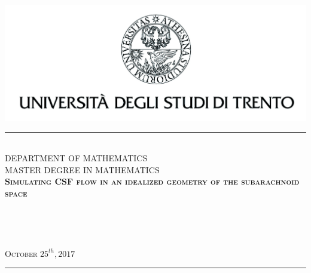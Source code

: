 \documentclass[a4paper,11pt,openright,twoside]{book}
\begin{document}

\begin{titlepage}
\begin{center}
\vspace*{-2.7cm}
\includegraphics{images/aquila_nome}
\\
\rule{\textwidth}{1pt}
\\[0.5cm]
{\Large DEPARTMENT OF MATHEMATICS}
\\[0.35cm]
{\Large MASTER DEGREE IN MATHEMATICS}
\\[3.5cm]
\textsc{\huge \textbf{Simulating CSF flow in an idealized geometry of the subarachnoid space}}
\\[4cm]
\begin{minipage}{0.5\textwidth}
\\
\end{minipage}
\begin{minipage}{0.45\textwidth}
\vspace{-3.2cm}
 \\
\end{minipage}

\vspace*{\fill}
{\textsc{\normalsize October $25^{th}, 2017$}}
\rule{\textwidth}{1pt}


\end{center}
\newpage
\thispagestyle{empty}
\phantom{}
\end{titlepage}
\newpage
\thispagestyle{empty}
\end{document}
